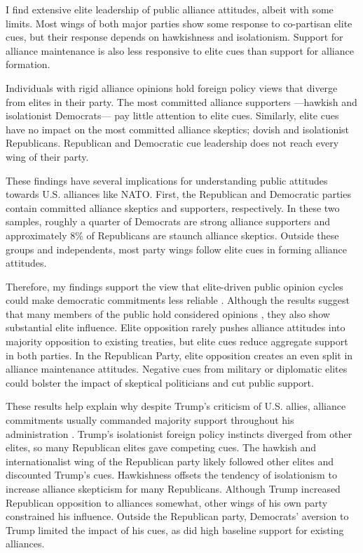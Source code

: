 \documentclass[12pt]{article}
\begin{document}
I find extensive elite leadership of public alliance attitudes, albeit with some limits.  
Most wings of both major parties show some response to co-partisan elite cues, but their response depends on hawkishness and isolationism.
Support for alliance maintenance is also less responsive to elite cues than support for alliance formation. 


Individuals with rigid alliance opinions hold foreign policy views that diverge from elites in their party.  
The most committed alliance supporters ---hawkish and isolationist Democrats--- pay little attention to elite cues.
Similarly, elite cues have no impact on the most committed alliance skeptics; dovish and isolationist Republicans. 
Republican and Democratic cue leadership does not reach every wing of their party. 


These findings have several implications for understanding public attitudes towards U.S. alliances like NATO. 
First, the Republican and Democratic parties contain committed alliance skeptics and supporters, respectively.
In these two samples, roughly a quarter of Democrats are strong alliance supporters and approximately 8\% of Republicans are staunch alliance skeptics.
Outside these groups and independents, most party wings follow elite cues in forming alliance attitudes. 


Therefore, my findings support the view that elite-driven public opinion cycles could make democratic commitments less reliable \citep{GartzkeGleditsch2004}. 
Although the results suggest that many members of the public hold considered opinions \citep{PageShapiro1992}, they also show substantial elite influence. 
Elite opposition rarely pushes alliance attitudes into majority opposition to existing treaties, but elite cues reduce aggregate support in both parties.
In the Republican Party, elite opposition creates an even split in alliance maintenance attitudes. 
Negative cues from military or diplomatic elites could bolster the impact of skeptical politicians and cut public support. 


These results help explain why despite Trump's criticism of U.S. allies, alliance commitments usually commanded majority support throughout his administration \citep{PewNATO2020}. 
Trump's isolationist foreign policy instincts diverged from other elites, so many Republican elites gave competing cues.
The hawkish and internationalist wing of the Republican party likely followed other elites and discounted Trump's cues. 
Hawkishness offsets the tendency of isolationism to increase alliance skepticism for many Republicans.
Although Trump increased Republican opposition to alliances somewhat, other wings of his own party constrained his influence.
Outside the Republican party, Democrats' aversion to Trump limited the impact of his cues, as did high baseline support for existing alliances. 
\end{document}
